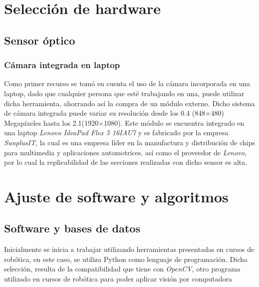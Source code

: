\chapter{Selección de hardware}

\section{Sensor óptico}

\subsection{Cámara integrada en laptop}

Como primer recurso se tomó en cuenta el uso de la cámara incorporada en una laptop, dado que cualquier persona que esté trabajando en una, puede utilizar dicha herramienta, ahorrando así la compra de un módulo externo. Dicho sistema de cámara integrada puede variar su resolución desde los 0.4 (848$\times$480) Megapíxeles hasta los 2.1(1920$\times$1080). Este módulo se encuentra integrado en una laptop \textit{Lenovo IdeaPad Flex 5 16IAU7} y es fabricado por la empresa \textit{SunplusIT}, la cual es una empresa líder en la manufactura y distribución de chips para multimedia y aplicaciones automotrices, así como el proveedor de \textit{Lenovo}, por lo cual la replicabilidad de las secciones realizadas con dicho sensor es alta.


\chapter{Ajuste de software y algoritmos}

\section{Software y bases de datos}
Inicialmente se inicia a trabajar utilizando herramientas presentadas en cursos de robótica, en este caso, se utiliza Python como lenguaje de programación. Dicha selección, resulta de la compatibilidad que tiene con \textit{OpenCV}, otro programa utilizado en cursos de robótica para poder aplicar visión por computadora


